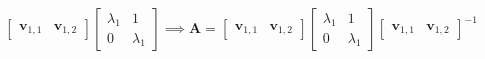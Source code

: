 \documentclass[12pt,a4paper]{article}
\begin{document}
\begin{itemize}
\begin{itemize}
\begin{equation}
\begin{bmatrix}
        \bm{v}_{1,1} & \bm{v}_{1,2}
      \end{bmatrix}
      \begin{bmatrix}
        \lambda_{1} & 1 \\
        0 & \lambda_{1}
      \end{bmatrix}
      \implies
      \bm{A}
      =
      \begin{bmatrix}
        \bm{v}_{1,1} & \bm{v}_{1,2}
      \end{bmatrix}
      \begin{bmatrix}
        \lambda_{1} & 1 \\
        0 & \lambda_{1}
      \end{bmatrix}
      \begin{bmatrix}
        \bm{v}_{1,1} & \bm{v}_{1,2}
      \end{bmatrix}^{-1}
    \end{equation}
    

\end{itemize}
\end{itemize}
\end{document}
